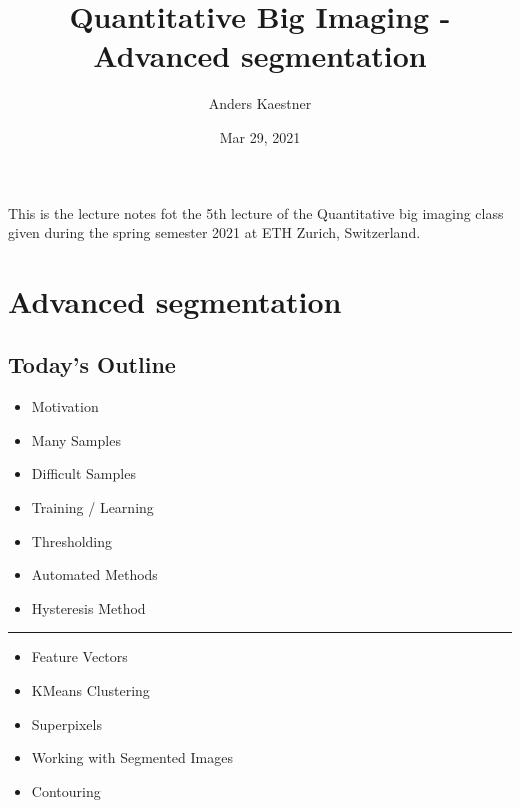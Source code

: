 \documentclass[letterpaper,10pt,english]{sphinxmanual}
\title{Quantitative Big Imaging - Advanced segmentation}
\date{Mar 29, 2021}
\author{Anders Kaestner}
\begin{document}
\pagestyle{empty}
\sphinxmaketitle
\pagestyle{plain}
\sphinxtableofcontents
\pagestyle{normal}
\label{\detokenize{preface::doc}}


\sphinxAtStartPar
This is the lecture notes fot the 5th lecture of the Quantitative big imaging class given during the spring semester 2021 at ETH Zurich, Switzerland.


\chapter{Advanced segmentation}
\label{\detokenize{05-AdvancedSegmentation:advanced-segmentation}}\label{\detokenize{05-AdvancedSegmentation::doc}}



\section{Today’s Outline}
\label{\detokenize{05-AdvancedSegmentation:today-s-outline}}\begin{itemize}
\item {} 
\sphinxAtStartPar
Motivation

\item {} 
\sphinxAtStartPar
Many Samples

\item {} 
\sphinxAtStartPar
Difficult Samples

\item {} 
\sphinxAtStartPar
Training / Learning

\item {} 
\sphinxAtStartPar
Thresholding

\item {} 
\sphinxAtStartPar
Automated Methods

\item {} 
\sphinxAtStartPar
Hysteresis Method

\end{itemize}


\bigskip\hrule\bigskip

\begin{itemize}
\item {} 
\sphinxAtStartPar
Feature Vectors

\item {} 
\sphinxAtStartPar
K\sphinxhyphen{}Means Clustering

\item {} 
\sphinxAtStartPar
Superpixels

\item {} 
\sphinxAtStartPar
Working with Segmented Images

\item {} 
\sphinxAtStartPar
Contouring

\end{itemize}
\end{document}
